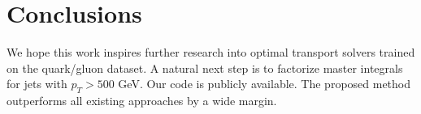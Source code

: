 \section{Conclusions}\label{sec:conclusions}

We hope this work inspires further research into optimal transport
solvers trained on the quark/gluon dataset. A natural next step is to
factorize master integrals for jets with $p_T > 500$ GeV. Our code is
publicly available. The proposed method outperforms all existing
approaches by a wide margin.

